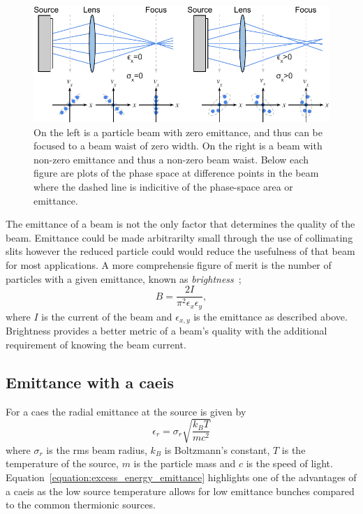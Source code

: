\begin{figure}
\center
\includegraphics{part2/Figs/EmittanceFocasability.pdf}
\caption{On the left is a particle beam with zero emittance, and thus can be focused to a beam waist of zero width. On the right is a beam with non-zero emittance and thus a non-zero beam waist. Below each figure are plots of the phase space at difference points in the beam where the dashed line is indicitive of the phase-space area or emittance.}
\label{figure:focusability}
\end{figure}

The emittance of a beam is not the only factor that determines the quality of the beam.
Emittance could be made arbitrarilty small through the use of collimating slits however the reduced particle could would reduce the usefulness of that beam for most applications.
A more comprehensie figure of merit is the number of particles with a given emittance, known as \emph{brightness}~\cite{reiser_theory_2008};
\begin{equation}
B = \frac{2I}{\pi^2\epsilon_x\epsilon_y},
\end{equation}
where $I$ is the current of the beam and $\epsilon_{x,y}$ is the emittance as described above.
Brightness provides a better metric of a beam's quality with the additional requirement of knowing the beam current.



\subsection{Emittance with a \gls{caeis}}
\label{section:excess_energy_emittance}

For a \gls{caes} the radial emittance at the source is given by~\cite{mcculloch_high-coherence_2013}
\begin{equation}\label{equation:excess_energy_emittance}
\epsilon_r = \sigma_r \sqrt{\frac{k_B T}{m c^2}}
\end{equation}
where $\sigma_r$ is the \gls{rms} beam radius, $k_B$ is Boltzmann's constant, $T$ is the temperature of the source, $m$ is the particle mass and $c$ is the speed of light.
Equation~\ref{equation:excess_energy_emittance} highlights one of the advantages of a \gls{caeis} as the low source temperature allows for low emittance bunches compared to the common thermionic sources.

